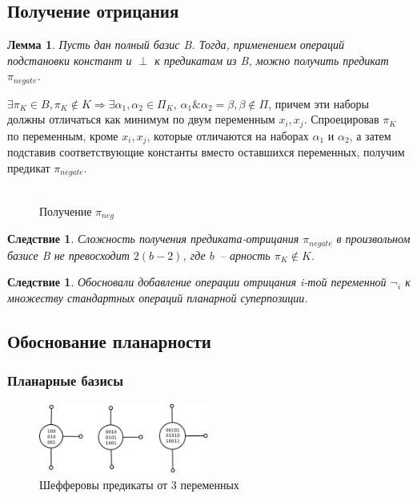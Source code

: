 \documentclass[12pt]{article}
\newtheorem{lemma}[theorem]{Лемма}
\newtheorem{corollary}[theorem]{Следствие}
\newenvironment{proof}[1][Доказательство]{\begin{trivlist}
\item[\hskip \labelsep {\bfseries #1}]}{\end{trivlist}}
\begin{document}
\subsection{Получение отрицания}
\begin{lemma}
\label{eq:negate}
Пусть дан полный базис B. Тогда, применением операций подстановки констант и $\perp$ к предикатам из B, можно получить предикат $\pi_{negate}$.
\end{lemma}

\begin{proof}
$\exists \pi_{K} \in B, \pi_K \notin K \Rightarrow \exists \alpha_1, \alpha_2 \in \Pi_K$,
$\alpha_1\&\alpha_2=\beta, \beta \notin \Pi$, причем эти наборы должны отличаться как минимум по двум переменным $x_i, x_{j}$.
Спроецировав $\pi_K$ по переменным, кроме $x_i, x_j$, 
которые отличаются на наборах $\alpha_1$ и $\alpha_2$, а затем подставив соответствующие
константы вместо оставшихся переменных, получим предикат $\pi_{negate}$.
\begin{figure}[htb]
\centering
\includegraphics[width=0.01\textwidth]{3_2to3.png}
\caption{Получение $\pi_{neg}$}
\label{fig:negation}
\end{figure}

\end{proof}
\begin{corollary}
\label{corol:negate}
Сложность получения предиката-отрицания $\pi_{negate}$ в произвольном базисе B не превосходит $2(b-2)$, 
где $b$~-- арность $\pi_K \notin K$.
\end{corollary}

\begin{corollary}
Обосновали добавление операции отрицания i-той переменной $\neg_i$ к множеству стандартных операций планарной суперпозиции.
\end{corollary}

\subsection{Обоснование планарности}
\subsubsection{Планарные базисы}

\begin{figure}[htb]
\centering
\includegraphics[width=0.5\textwidth]{scheff3.png}
\caption{Шефферовы предикаты от 3 переменных}
\label{fig:sheff}
\end{figure}
\end{document}
